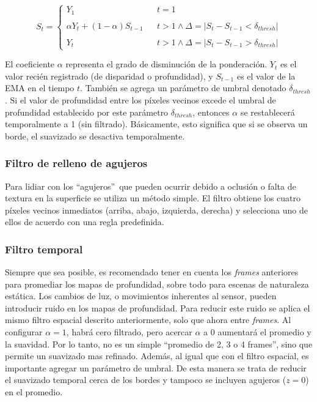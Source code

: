 \begin{equation}
	S_t = \left\{ \begin{array}{lcc}
		Y_1 & &  t = 1\\
		\\ \alpha Y_t + (1-\alpha)S_{t-1} &  &t > 1 \wedge \Delta=|S_t - S_{t-1} < \delta_{thresh}|\\
		\\ Y_t & & t > 1 \wedge \Delta=|S_t - S_{t-1} > \delta_{thresh}|
	\end{array}
	\right.
\end{equation}

El coeficiente $\alpha$ representa el grado de disminución de la ponderación. $Y_t$ es el valor recién registrado (de disparidad o profundidad), y $S_{t-1}$ es el valor de la EMA en el tiempo $t$. También se agrega un parámetro de umbral denotado $\delta_{thresh}$. Si el valor de profundidad entre los píxeles vecinos excede el umbral de profundidad establecido por este parámetro $\delta_{thresh}$, entonces $\alpha$ se restablecerá temporalmente a 1 (sin filtrado). Básicamente, esto significa que si se observa un borde, el suavizado se desactiva temporalmente.


\subsubsection{Filtro de relleno de agujeros}

Para lidiar con los \textquotedblleft agujeros\textquotedblright\ que pueden ocurrir debido a oclusión o falta de textura en la superficie se utiliza un método simple. El filtro obtiene los cuatro píxeles vecinos inmediatos (arriba, abajo, izquierda, derecha) y selecciona uno de ellos de acuerdo con una regla predefinida.

\subsubsection{Filtro temporal}

Siempre que sea posible, es recomendado tener en cuenta los \textit{frames} anteriores para promediar los mapas de profundidad, sobre todo para escenas de naturaleza estática. Los cambios de luz, o movimientos inherentes al sensor, pueden introducir ruido en los mapas de profundidad. Para reducir este ruido se aplica el mismo filtro espacial descrito anteriormente, solo que ahora entre \textit{frames}. Al configurar $\alpha = 1$, habrá cero filtrado, pero acercar $\alpha$ a 0 aumentará el promedio y la suavidad. Por lo tanto, no es un simple ``promedio de 2, 3 o 4 frames'', sino que permite un suavizado mas refinado. Además, al igual que con el filtro espacial, es importante agregar un parámetro de umbral. De esta manera se trata de reducir el suavizado temporal cerca de los bordes y tampoco se incluyen agujeros ($z=0$) en el promedio.

